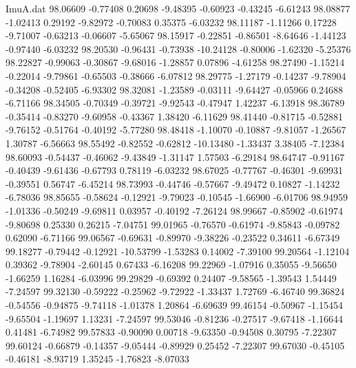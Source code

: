 \begin{filecontents}{ImuA.dat}
  98.06609   -0.77408    0.20698   -9.48395   -0.60923   -0.43245   -6.61243
  98.08877   -1.02413    0.29192   -9.82972   -0.70083    0.35375   -6.03232
  98.11187   -1.11266    0.17228   -9.71007   -0.63213   -0.06607   -5.65067
  98.15917   -0.22851   -0.86501   -8.64646   -1.44123   -0.97440   -6.03232
  98.20530   -0.96431   -0.73938  -10.24128   -0.80006   -1.62320   -5.25376
  98.22827   -0.99063   -0.30867   -9.68016   -1.28857    0.07896   -4.61258
  98.27490   -1.15214   -0.22014   -9.79861   -0.65503   -0.38666   -6.07812
  98.29775   -1.27179   -0.14237   -9.78904   -0.34208   -0.52405   -6.93302
  98.32081   -1.23589   -0.03111   -9.64427   -0.05966    0.24688   -6.71166
  98.34505   -0.70349   -0.39721   -9.92543   -0.47947    1.42237   -6.13918
  98.36789   -0.35414   -0.83270   -9.60958   -0.43367    1.38420   -6.11629
  98.41440   -0.81715   -0.52881   -9.76152   -0.51764   -0.40192   -5.77280
  98.48418   -1.10070   -0.10887   -9.81057   -1.26567    1.30787   -6.56663
  98.55492   -0.82552   -0.62812  -10.13480   -1.33437    3.38405   -7.12384
  98.60093   -0.54437   -0.46062   -9.43849   -1.31147    1.57503   -6.29184
  98.64747   -0.91167   -0.40439   -9.61436   -0.67793    0.78119   -6.03232
  98.67025   -0.77767   -0.46301   -9.69931   -0.39551    0.56747   -6.45214
  98.73993   -0.44746   -0.57667   -9.49472    0.10827   -1.14232   -6.78036
  98.85655   -0.58624   -0.12921   -9.79023   -0.10545   -1.66900   -6.01706
  98.94959   -1.01336   -0.50249   -9.69811    0.03957   -0.40192   -7.26124
  98.99667   -0.85902   -0.61974   -9.80698    0.25330    0.26215   -7.04751
  99.01965   -0.76570   -0.61974   -9.85843   -0.09782    0.62090   -6.71166
  99.06567   -0.69631   -0.89970   -9.38226   -0.23522    0.34611   -6.67349
  99.18277   -0.79442   -0.12921  -10.53799   -1.53283    0.14002   -7.39100
  99.20564   -1.12104    0.39362   -9.78904   -2.60145    0.67433   -6.16208
  99.22969   -1.07916    0.35055   -9.56650   -1.66259    1.16284   -6.03996
  99.29829   -0.69392    0.24407   -9.58565   -1.39543    1.54449   -7.24597
  99.32130   -0.59222   -0.25962   -9.72922   -1.33437    1.72769   -6.46740
  99.36824   -0.54556   -0.94875   -9.74118   -1.01378    1.20864   -6.69639
  99.46154   -0.50967   -1.15454   -9.65504   -1.19697    1.13231   -7.24597
  99.53046   -0.81236   -0.27517   -9.67418   -1.16644    0.41481   -6.74982
  99.57833   -0.90090    0.00718   -9.63350   -0.94508    0.30795   -7.22307
  99.60124   -0.66879   -0.14357   -9.05444   -0.89929    0.25452   -7.22307
  99.67030   -0.45105   -0.46181   -8.93719    1.35245   -1.76823   -8.07033

\end{filecontents}
